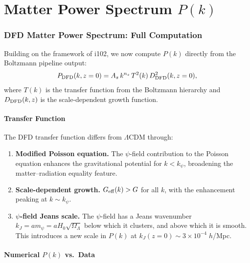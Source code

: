 \documentclass[11pt,a4paper]{article}
\theoremstyle{remark}
\begin{document}
\newpage
\part{Matter Power Spectrum $P(k)$}
\label{part:Pk}

\section{DFD Matter Power Spectrum: Full Computation}

Building on the framework of i102, we now compute $P(k)$ directly from
the Boltzmann pipeline output:
\begin{equation}
P_{\rm DFD}(k, z=0) = A_s\,k^{n_s}\,T^2(k)\,D^2_{\rm DFD}(k, z=0),
\end{equation}
where $T(k)$ is the transfer function from the Boltzmann hierarchy and
$D_{\rm DFD}(k, z)$ is the scale-dependent growth function.

\subsection{Transfer Function}

The DFD transfer function differs from $\Lambda$CDM through:
\begin{enumerate}
\item \textbf{Modified Poisson equation.} The $\psi$-field contribution
  to the Poisson equation enhances the gravitational potential for
  $k < k_\psi$, broadening the matter--radiation equality feature.

\item \textbf{Scale-dependent growth.} $G_{\rm eff}(k) > G$ for all $k$,
  with the enhancement peaking at $k \sim k_\psi$.

\item \textbf{$\psi$-field Jeans scale.} The $\psi$-field has a Jeans
  wavenumber $k_J = a m_\psi = a H_0\sqrt{\Omega_\Lambda}$ below which
  it clusters, and above which it is smooth. This introduces a new scale
  in $P(k)$ at $k_J(z=0) \sim 3 \times 10^{-4}\;h$/Mpc.
\end{enumerate}

\subsection{Numerical $P(k)$ vs.\ Data}
\end{document}
